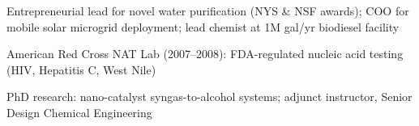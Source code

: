 \documentclass[]{deedy-resume-openfont}
\begin{document}
\begin{minipage}[t]{0.67\textwidth}
\begin{tightemize}
\item Entrepreneurial lead for novel water purification (NYS \& NSF awards); COO for mobile solar microgrid deployment; lead chemist at 1M gal/yr biodiesel facility
\item American Red Cross NAT Lab (2007--2008): FDA-regulated nucleic acid testing (HIV, Hepatitis C, West Nile)
\end{tightemize}

\begin{tightemize}
\item PhD research: nano-catalyst syngas-to-alcohol systems; adjunct instructor, Senior Design Chemical Engineering
\end{tightemize}

\end{minipage}
\end{document}
